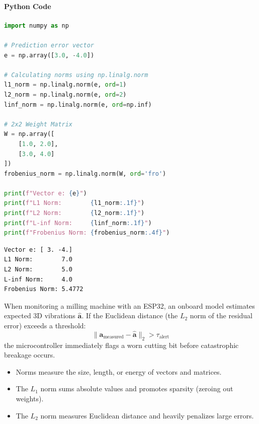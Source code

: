 \paragraph{Python Code}
\begin{lstlisting}[language=Python]
import numpy as np

# Prediction error vector
e = np.array([3.0, -4.0])

# Calculating norms using np.linalg.norm
l1_norm = np.linalg.norm(e, ord=1)
l2_norm = np.linalg.norm(e, ord=2)
linf_norm = np.linalg.norm(e, ord=np.inf)

# 2x2 Weight Matrix
W = np.array([
    [1.0, 2.0],
    [3.0, 4.0]
])
frobenius_norm = np.linalg.norm(W, ord='fro')

print(f"Vector e: {e}")
print(f"L1 Norm:        {l1_norm:.1f}")
print(f"L2 Norm:        {l2_norm:.1f}")
print(f"L-inf Norm:     {linf_norm:.1f}")
print(f"Frobenius Norm: {frobenius_norm:.4f}")
\end{lstlisting}

\begin{lstlisting}[style=outputstyle]
Vector e: [ 3. -4.]
L1 Norm:        7.0
L2 Norm:        5.0
L-inf Norm:     4.0
Frobenius Norm: 5.4772
\end{lstlisting}

\begin{iotbox}
When monitoring a milling machine with an ESP32, an onboard model estimates expected 3D vibrations $\hat{\mathbf{a}}$. If the Euclidean distance (the $L_2$ norm of the residual error) exceeds a threshold:
\begin{equation*}
\|\mathbf{a}_{\text{measured}} - \hat{\mathbf{a}}\|_2 > \tau_{\text{alert}}
\end{equation*}
the microcontroller immediately flags a worn cutting bit before catastrophic breakage occurs.
\end{iotbox}

\begin{takeaways}
\begin{itemize}
    \item Norms measure the size, length, or energy of vectors and matrices.
    \item The $L_1$ norm sums absolute values and promotes sparsity (zeroing out weights).
    \item The $L_2$ norm measures Euclidean distance and heavily penalizes large errors.
\end{itemize}
\end{takeaways}

